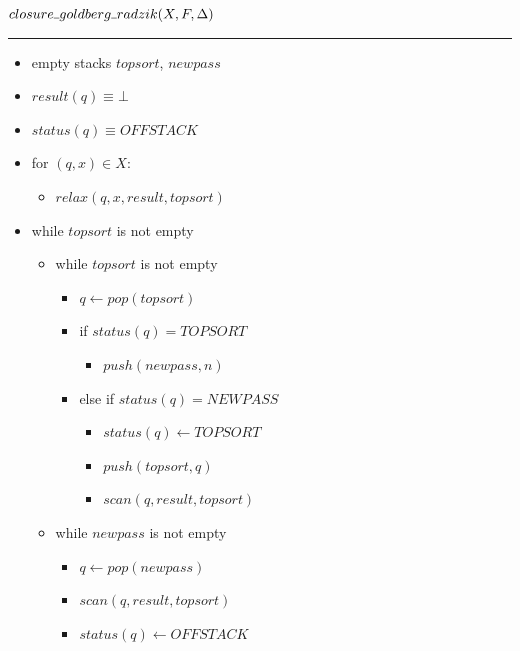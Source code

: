 \documentclass{article}
\newcommand{\Xset}{\!\leftarrow\!}
\newcommand{\Xund}{\rule{.4em}{.4pt}} %
\newcommand{\Xin}{\!\in\!}
\newcommand{\Xeq}{\!=\!}
\theoremstyle{definition}
\begin{document}
\begin{multicols}{2}
    $closure \Xund goldberg \Xund radzik(X, F, \Delta)$
    \hrule
    \begin{itemize}[leftmargin=0in]
        \smallskip
        \item[] empty stacks $topsort$, $newpass$
        \item[] $result(q) \equiv \bot$
        \item[] $status(q) \equiv \mathit{OFFSTACK}$
        \item[] for $(q, x) \Xin X$:
        \begin{itemize}
            \item[] $relax(q, x, result, topsort)$
        \end{itemize}
        \item[] while $topsort$ is not empty
        \begin{itemize}

            \smallskip
            \item[] while $topsort$ is not empty
            \begin{itemize}
                \item[] $q \Xset pop(topsort)$

                \item[] if $status(q) \Xeq \mathit{TOPSORT}$
                \begin{itemize}
                    \item[] $push(newpass, n)$
                \end{itemize}

                \item[] else if $status(q) \Xeq \mathit{NEWPASS}$
                \begin{itemize}
                    \item[] $status(q) \Xset \mathit{TOPSORT}$
                    \item[] $push(topsort, q)$
                    \item[] $scan(q, result, topsort)$
                \end{itemize}
            \end{itemize}

            \smallskip
            \item[] while $newpass$ is not empty
            \begin{itemize}
                \item[] $q \Xset pop(newpass)$
                \item[] $scan(q, result, topsort)$
                \item[] $status(q) \Xset \mathit{OFFSTACK}$
            \end{itemize}
        \end{itemize}


\end{itemize}
\end{multicols}
\end{document}
